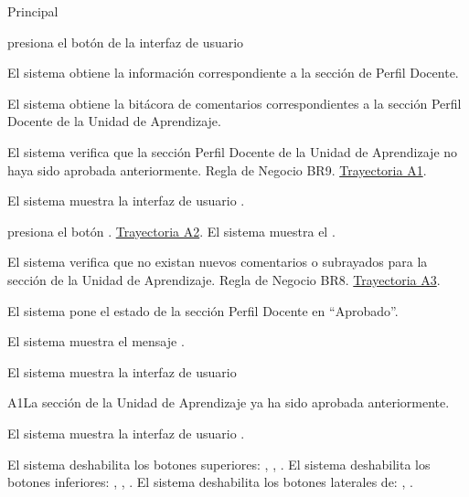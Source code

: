 \begin{UCtrayectoria}{Principal}

    \UCpaso[\UCactor] presiona el botón   de la interfaz de usuario 

    \UCpaso El sistema obtiene la información correspondiente a la sección de Perfil Docente.
    
    \UCpaso El sistema obtiene la bitácora de comentarios correspondientes a la sección Perfil Docente de la Unidad de Aprendizaje. 
    
    \UCpaso El sistema verifica que la sección Perfil Docente de la Unidad de Aprendizaje no haya sido aprobada anteriormente. Regla de Negocio BR9. \hyperlink{SP2-CU11-A1}{Trayectoria A1}. 
    
    \UCpaso El sistema muestra la interfaz de usuario  . 
    
    \UCpaso[\UCactor] presiona el botón . \hyperlink{SP2-CU11-A2}{Trayectoria A2}.
    \UCpaso El sistema muestra el .
    
    \UCpaso	El sistema verifica que no existan nuevos comentarios o subrayados para la sección de la Unidad de Aprendizaje. Regla de Negocio BR8. \hyperlink{SP2-CU11-A3}{Trayectoria A3}. 
    
    \UCpaso El sistema pone el estado de la sección Perfil Docente en “Aprobado”.
    
    \UCpaso El sistema muestra el mensaje .

    \UCpaso El sistema muestra la interfaz de usuario 

\end{UCtrayectoria}


\begin{UCtrayectoriaA}{A1}{La sección de la Unidad de Aprendizaje ya ha sido aprobada anteriormente.}

	\hypertarget{SP2-CU11-A1}{\UCpaso El sistema muestra la interfaz de usuario .}
    \UCpaso El sistema deshabilita los botones superiores: , , .
    \UCpaso El sistema deshabilita los botones inferiores: , , .
    \UCpaso El sistema deshabilita los botones laterales de: , .
\end{UCtrayectoriaA}

